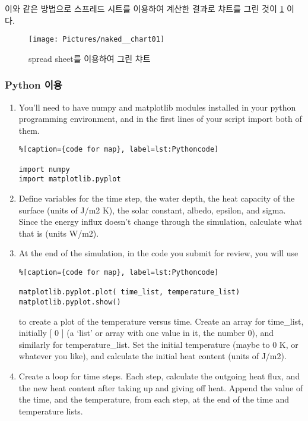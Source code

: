 {이와 같은 방법으로 스프레드 시트를 이용하여 계산한 결과로 챠트를 그린 것이 \ref{fig:nakedchart01} 이다. 
\begin{figure}[b!]
	\centering
	\texttt{[image: Pictures/naked\_\_chart01]}
	\caption{spread sheet를 이용하여 그린 챠트}
	\label{fig:nakedchart01}
\end{figure}

\newpage

\subsubsection{Python 이용}\index{}
\begin{enumerate}
	\item You’ll need to have numpy and matplotlib modules installed in your python programming environment, and in the first lines of your script import both of them.


\begin{lstlisting}%[caption={code for map}, label=lst:Pythoncode]

import numpy
import matplotlib.pyplot
\end{lstlisting}

	\item Define variables for the time step, the water depth, the heat capacity of the surface (units of J/m2 K), the solar constant, albedo, epsilon, and sigma. Since the energy influx doesn’t change through the simulation, calculate what that is (units W/m2).
	\item At the end of the simulation, in the code you submit for review, you will use

\begin{lstlisting}%[caption={code for map}, label=lst:Pythoncode]

matplotlib.pyplot.plot( time_list, temperature_list)
matplotlib.pyplot.show()
\end{lstlisting}

to create a plot of the temperature versus time. Create an array for time_list, initially [ 0 ] (a ‘list’ or array with one value in it, the number 0), and similarly for temperature_list. Set the initial temperature (maybe to 0 K, or whatever you like), and calculate the initial heat content (units of J/m2).

	\item Create a loop for time steps. Each step, calculate the outgoing heat flux, and the new heat content after taking up and giving off heat. Append the value of the time, and the temperature, from each step, at the end of the time and temperature lists.
	

\end{enumerate}}
